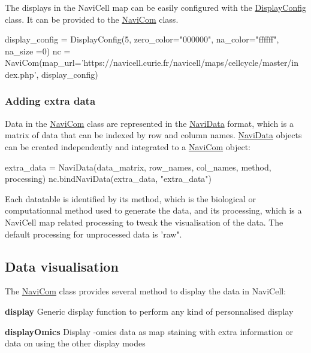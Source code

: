 The displays in the NaviCell map can be easily configured with the \hyperlink{classnavicom_1_1displayConfig_1_1DisplayConfig}{DisplayConfig} class. It can be provided to the \hyperlink{classnavicom_1_1navicom_1_1NaviCom}{NaviCom} class. 
\begin{DoxyCode}
display\_config = DisplayConfig(5, zero\_color=\textcolor{stringliteral}{"000000"}, na\_color=\textcolor{stringliteral}{"ffffff"}, na\_size
      =0)
nc = NaviCom(map\_url=\textcolor{stringliteral}{'https://navicell.curie.fr/navicell/maps/cellcycle/master/in
      dex.php'}, display\_config)
\end{DoxyCode}
\hypertarget{main_extra_data}{}\subsubsection{Adding extra data}\label{main_extra_data}
Data in the \hyperlink{classnavicom_1_1navicom_1_1NaviCom}{NaviCom} class are represented in the \hyperlink{classnavicom_1_1navidata_1_1NaviData}{NaviData} format, which is a matrix of data that can be indexed by row and column names. \hyperlink{classnavicom_1_1navidata_1_1NaviData}{NaviData} objects can be created independently and integrated to a \hyperlink{classnavicom_1_1navicom_1_1NaviCom}{NaviCom} object: 
\begin{DoxyCode}
extra\_data = NaviData(data\_matrix, row\_names, col\_names, method, processing)
nc.bindNaviData(extra\_data, \textcolor{stringliteral}{"extra\_data"})
\end{DoxyCode}
 Each datatable is identified by its method, which is the biological or computationnal method used to generate the data, and its processing, which is a NaviCell map related processing to tweak the visualisation of the data. The default processing for unprocessed data is 'raw".\hypertarget{main_visualisation}{}\subsection{Data visualisation}\label{main_visualisation}
The \hyperlink{classnavicom_1_1navicom_1_1NaviCom}{NaviCom} class provides several method to display the data in NaviCell: \begin{DoxyItemize}
\item {\bfseries display} Generic display function to perform any kind of personnalised display \item {\bfseries displayOmics} Display -\/omics data as map staining with extra information or data on using the other display modes \end{DoxyItemize}
